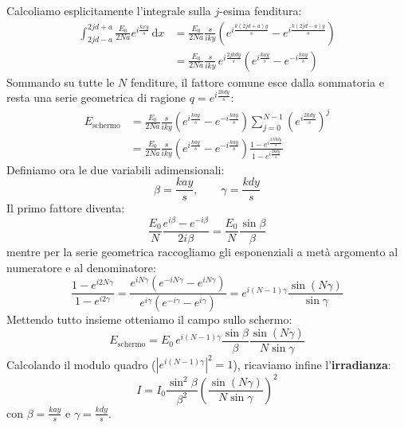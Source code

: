 \documentclass[openany,a4paper,12pt]{book}
\begin{document}
Calcoliamo esplicitamente l'integrale sulla $j$-esima fenditura:
\begin{align*}
    \int_{2jd-a}^{2jd+a} \frac{E_0}{2Na} e^{i\frac{k x y}{s}}\,\mathrm{d}x
    &= \frac{E_0}{2Na} \frac{s}{i k y} \left(e^{i\frac{k(2jd+a)y}{s}} - e^{i\frac{k(2jd-a)y}{s}}\right) \\
    &= \frac{E_0}{2Na} \frac{s}{i k y} \, e^{i\frac{2jkdy}{s}} \left(e^{i\frac{kay}{s}} - e^{-i\frac{kay}{s}}\right)
\end{align*}
Sommando su tutte le $N$ fenditure, il fattore comune esce dalla sommatoria e resta una serie geometrica di ragione $q = e^{i\frac{2kdy}{s}}$:
\begin{align*}
    E_{\text{schermo}}
    &= \frac{E_0}{2Na} \frac{s}{i k y} \left(e^{i\frac{kay}{s}} - e^{-i\frac{kay}{s}}\right) \sum_{j=0}^{N-1} \left(e^{i\frac{2kdy}{s}}\right)^j \\
    &= \frac{E_0}{2Na} \frac{s}{i k y} \left(e^{i\frac{kay}{s}} - e^{-i\frac{kay}{s}}\right) \frac{1 - e^{i\frac{2Nkdy}{s}}}{1 - e^{i\frac{2kdy}{s}}}
\end{align*}
Definiamo ora le due variabili adimensionali:
\[
    \beta = \frac{k a y}{s}, \qquad \gamma = \frac{k d y}{s}
\]
Il primo fattore diventa:
\[
    \frac{E_0}{N} \frac{e^{i\beta} - e^{-i\beta}}{2 i \beta} = \frac{E_0}{N} \frac{\sin\beta}{\beta}
\]
mentre per la serie geometrica raccogliamo gli esponenziali a metà argomento al numeratore e al denominatore:
\[
    \frac{1 - e^{i 2 N \gamma}}{1 - e^{i 2 \gamma}} = \frac{e^{i N \gamma}\left(e^{-i N \gamma} - e^{i N \gamma}\right)}{e^{i \gamma}\left(e^{-i \gamma} - e^{i \gamma}\right)} = e^{i(N-1)\gamma} \frac{\sin(N\gamma)}{\sin\gamma}
\]
Mettendo tutto insieme otteniamo il campo sullo schermo:
\[
    E_{\text{schermo}} = E_0 \, e^{i(N-1)\gamma} \frac{\sin\beta}{\beta} \frac{\sin(N\gamma)}{N \sin\gamma}
\]
Calcolando il modulo quadro ($|e^{i(N-1)\gamma}|^2 = 1$), ricaviamo infine l'\textbf{irradianza}:
\[
    I = I_0 \frac{\sin^2\beta}{\beta^2} \left(\frac{\sin(N\gamma)}{N \sin\gamma}\right)^2
\]
con $\beta = \frac{k a y}{s}$ e $\gamma = \frac{k d y}{s}$.
\end{document}
